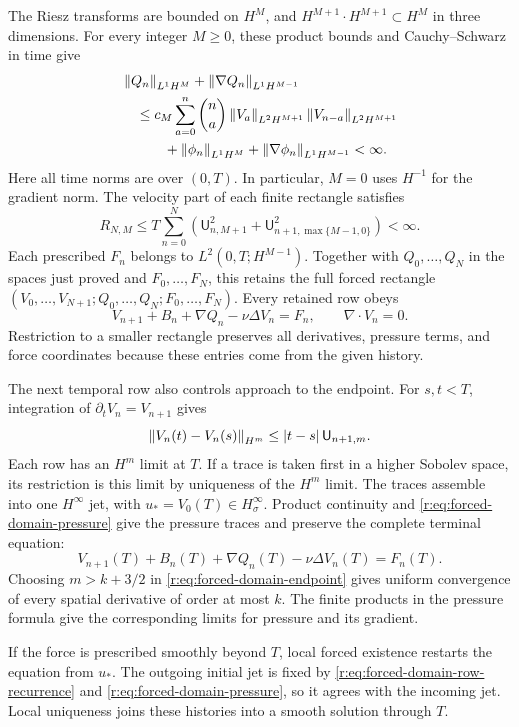 The Riesz transforms are bounded on \(H^M\), and
\(H^{M+1}\cdot H^{M+1}\subset H^M\) in three dimensions.
For every integer \(M\ge0\), these product bounds and
Cauchy--Schwarz in time give
\begin{equation}
 \begin{aligned}
 &\left\lVert Q_n\right\rVert_{L^1H^M}
       +\left\lVert \nabla Q_n\right\rVert_{L^1H^{M-1}}\\
 &\quad\le c_M\sum_{a=0}^n\binom na
       \left\lVert V_a\right\rVert_{L^2H^{M+1}}\left\lVert V_{n-a}\right\rVert_{L^2H^{M+1}}\\
 &\qquad\quad+\left\lVert \phi_n\right\rVert_{L^1H^M}
       +\left\lVert \nabla\phi_n\right\rVert_{L^1H^{M-1}}<\infty.
 \end{aligned}
 \label{r:eq:forced-domain-pressure-integrals}
\end{equation}
Here all time norms are over \((0,T)\). In particular, \(M=0\)
uses \(H^{-1}\) for the gradient norm.
The velocity part of each finite rectangle satisfies
\begin{equation}
 R_{N,M}
 \le T\sum_{n=0}^N
 \left(\mathsf U_{n,M+1}^2+
       \mathsf U_{n+1,\max\{M-1,0\}}^2\right)<\infty.
 \label{r:eq:forced-domain-rectangles}
\end{equation}
Each prescribed \(F_n\) belongs to \(L^2(0,T;H^{M-1})\).
Together with \(Q_0,\ldots,Q_N\) in the spaces just proved and
\(F_0,\ldots,F_N\), this retains the full forced rectangle
\((V_0,\ldots,V_{N+1};Q_0,\ldots,Q_N;F_0,\ldots,F_N)\).
Every retained row obeys
\[
 V_{n+1}+B_n+\nabla Q_n-\nu\Delta V_n=F_n,
 \qquad \nabla\cdot V_n=0.
\]
Restriction to a smaller rectangle preserves all derivatives, pressure
terms, and force coordinates because these entries come from the
given history.

The next temporal row also controls approach to the endpoint.
For \(s,t<T\), integration of \(\partial_tV_n=V_{n+1}\) gives
\begin{equation}
 \left\lVert V_n(t)-V_n(s)\right\rVert_{H^m}
 \le |t-s|\,\mathsf U_{n+1,m}.
 \label{r:eq:forced-domain-endpoint}
\end{equation}
Each row has an \(H^m\) limit at \(T\). If a trace is taken first in
a higher Sobolev space, its restriction is this limit by uniqueness
of the \(H^m\) limit. The traces assemble into one \(H^\infty\) jet,
with \(u_*=V_0(T)\in H^\infty_\sigma\).
Product continuity and \eqref{r:eq:forced-domain-pressure} give the
pressure traces and preserve the complete terminal equation:
\[
 V_{n+1}(T)+B_n(T)+\nabla Q_n(T)-\nu\Delta V_n(T)=F_n(T).
\]
Choosing \(m>k+3/2\) in \eqref{r:eq:forced-domain-endpoint} gives uniform
convergence of every spatial derivative of order at most \(k\).
The finite products in the pressure formula give the corresponding
limits for pressure and its gradient.

If the force is prescribed smoothly beyond \(T\), local forced
existence restarts the equation from \(u_*\).
The outgoing initial jet is fixed by
\eqref{r:eq:forced-domain-row-recurrence} and
\eqref{r:eq:forced-domain-pressure}, so it agrees with the incoming
jet. Local uniqueness joins these histories into a smooth solution
through \(T\).

